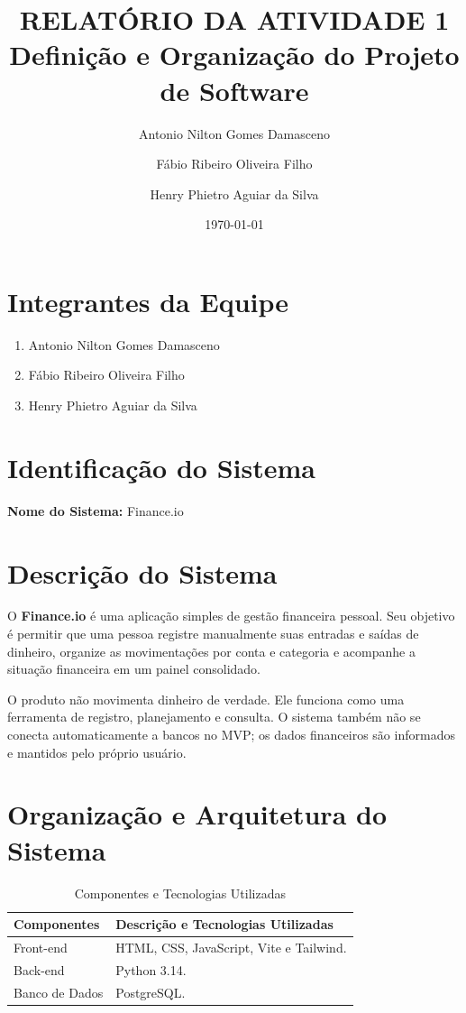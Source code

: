 \documentclass[11pt, a4paper]{article}
\title{\textbf{RELATÓRIO DA ATIVIDADE 1}\\Definição e Organização do Projeto de Software}
\author{
    Antonio Nilton Gomes Damasceno \and
    Fábio Ribeiro Oliveira Filho \and
    Henry Phietro Aguiar da Silva
}
\date{\today}
\begin{document}
\maketitle

\section{Integrantes da Equipe}
\begin{enumerate}
    \item Antonio Nilton Gomes Damasceno
    \item Fábio Ribeiro Oliveira Filho
    \item Henry Phietro Aguiar da Silva
\end{enumerate}

\section{Identificação do Sistema}
\textbf{Nome do Sistema:} Finance.io

\section{Descrição do Sistema}
O \textbf{Finance.io} é uma aplicação simples de gestão financeira pessoal. Seu objetivo é permitir que uma pessoa registre manualmente suas entradas e saídas de dinheiro, organize as movimentações por conta e categoria e acompanhe a situação financeira em um painel consolidado.

O produto não movimenta dinheiro de verdade. Ele funciona como uma ferramenta de registro, planejamento e consulta. O sistema também não se conecta automaticamente a bancos no MVP; os dados financeiros são informados e mantidos pelo próprio usuário.

\section{Organização e Arquitetura do Sistema}

\begin{table}[h]
\centering
\caption{Componentes e Tecnologias Utilizadas}
\vspace{0.2cm}
\begin{tabular}{lp{10cm}}
\toprule
\textbf{Componentes} & \textbf{Descrição e Tecnologias Utilizadas} \\
\midrule
Front-end & HTML, CSS, JavaScript, Vite e Tailwind. \\
Back-end & Python 3.14. \\
Banco de Dados & PostgreSQL. \\
\bottomrule
\end{tabular}
\end{table}
\end{document}
